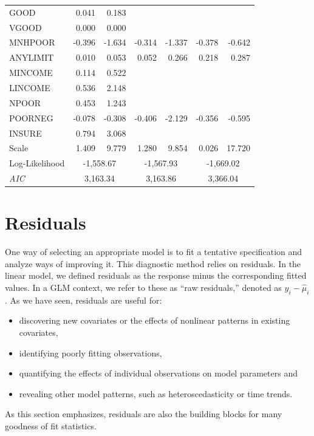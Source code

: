 \begin{table}[h]
\begin{center}
\begin{tabular}{l|rr|rr|rr}
      GOOD &      0.041 &      0.183 &            &            &            &            \\
     VGOOD &      0.000 &      0.000 &            &            &            &            \\
   MNHPOOR &     -0.396 &     -1.634 &     -0.314 &     -1.337 &     -0.378 &     -0.642 \\
  ANYLIMIT &      0.010 &      0.053 &      0.052 &      0.266 &      0.218 &      0.287 \\\hline
   MINCOME &      0.114 &      0.522 &            &            &            &            \\
   LINCOME &      0.536 &      2.148 &            &            &            &            \\
     NPOOR &      0.453 &      1.243 &            &            &            &            \\
   POORNEG &     -0.078 &     -0.308 &     -0.406 &     -2.129 &     -0.356 &     -0.595 \\
    INSURE &      0.794 &      3.068 &            &            &            &            \\\hline
     Scale &      1.409 &      9.779 &      1.280 &      9.854 &      0.026 &     17.720 \\ \hline
Log-Likelihood & \multicolumn{2}{|c|}{-1,558.67 } &
\multicolumn{2}{|c|}{ -1,567.93  } & \multicolumn{2}{|c}{-1,669.02 } \\
\textit{AIC} & \multicolumn{2}{|c|}{  3,163.34} &
\multicolumn{2}{|c|}{  3,163.86} & \multicolumn{2}{|c}{ 3,366.04} \\
\hline
\end{tabular}\end{center}\end{table}


\bigskip


\newpage

\section{Residuals}

One way of selecting an appropriate model is to fit a tentative
specification and analyze ways of improving it. This diagnostic
method relies on residuals. In the linear model, we defined
residuals as the response minus the corresponding fitted values. In
a GLM context, we refer to these as ``raw residuals,'' denoted as
$y_i - \widehat{\mu}_i$. As we have seen, residuals are useful for:
\begin{itemize}
\item discovering new covariates or the effects of nonlinear
patterns in existing covariates,
\item identifying poorly fitting observations,
\item quantifying the effects of individual observations on model
parameters and
\item revealing other model patterns, such as heteroscedasticity or
time trends.
\end{itemize}
As this section emphasizes, residuals are also the building blocks
for many goodness of fit statistics.

